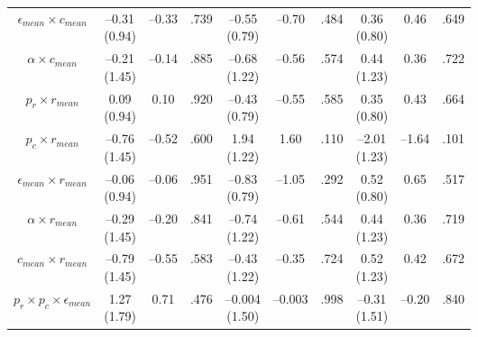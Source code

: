 \documentclass[
  11pt,
]{article}
\begin{document}
\begin{landscape}
\begin{ThreePartTable}
\begin{longtable}[t]{cccccccccc}
$\epsilon_{mean} \times c_{mean}$ & \makecell[c]{–0.31\\(0.94)} & –0.33 & .739 & \makecell[c]{–0.55\\(0.79)} & –0.70 & .484 & \makecell[c]{0.36\\(0.80)} & 0.46 & .649\\
$\alpha \times c_{mean}$ & \makecell[c]{–0.21\\(1.45)} & –0.14 & .885 & \makecell[c]{–0.68\\(1.22)} & –0.56 & .574 & \makecell[c]{0.44\\(1.23)} & 0.36 & .722\\
$p_r \times r_{mean}$ & \makecell[c]{0.09\\(0.94)} & 0.10 & .920 & \makecell[c]{–0.43\\(0.79)} & –0.55 & .585 & \makecell[c]{0.35\\(0.80)} & 0.43 & .664\\
$p_c \times r_{mean}$ & \makecell[c]{–0.76\\(1.45)} & –0.52 & .600 & \makecell[c]{1.94\\(1.22)} & 1.60 & .110 & \makecell[c]{–2.01\\(1.23)} & –1.64 & .101\\
$\epsilon_{mean} \times r_{mean}$ & \makecell[c]{–0.06\\(0.94)} & –0.06 & .951 & \makecell[c]{–0.83\\(0.79)} & –1.05 & .292 & \makecell[c]{0.52\\(0.80)} & 0.65 & .517\\
\addlinespace
$\alpha \times r_{mean}$ & \makecell[c]{–0.29\\(1.45)} & –0.20 & .841 & \makecell[c]{–0.74\\(1.22)} & –0.61 & .544 & \makecell[c]{0.44\\(1.23)} & 0.36 & .719\\
$c_{mean} \times r_{mean}$ & \makecell[c]{–0.79\\(1.45)} & –0.55 & .583 & \makecell[c]{–0.43\\(1.22)} & –0.35 & .724 & \makecell[c]{0.52\\(1.23)} & 0.42 & .672\\
$p_r \times p_c \times \epsilon_{mean}$ & \makecell[c]{1.27\\(1.79)} & 0.71 & .476 & \makecell[c]{–0.004\\(1.50)} & –0.003 & .998 & \makecell[c]{–0.31\\(1.51)} & –0.20 & .840\\

\end{longtable}
\end{ThreePartTable}
\end{landscape}
\end{document}
